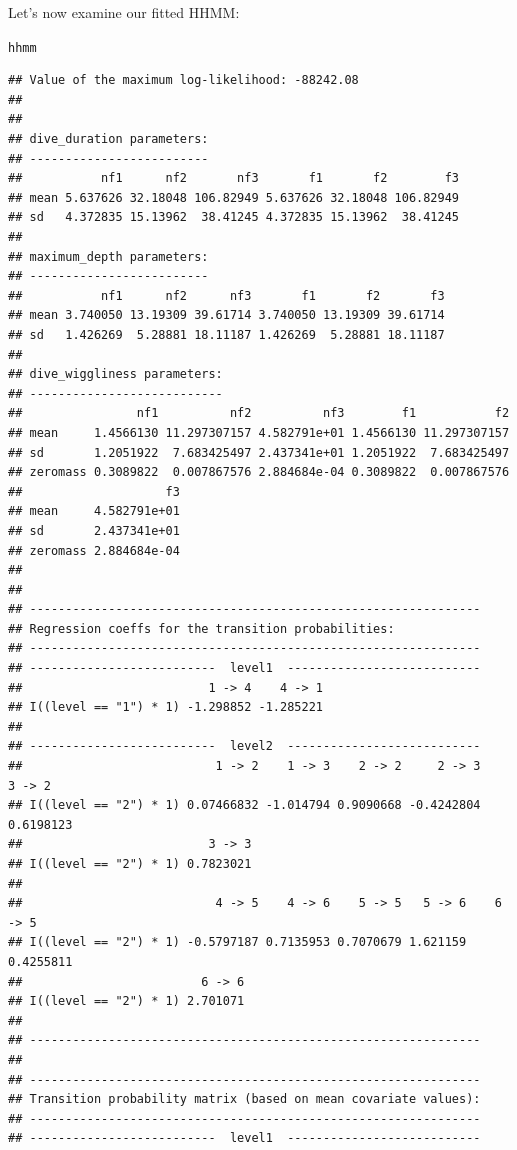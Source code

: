 \documentclass[12pt]{article}\usepackage[]{graphicx}\usepackage[]{xcolor}
\makeatletter
\newcommand{\hldef}[1]{\textcolor[rgb]{0.345,0.345,0.345}{#1}}%
\newenvironment{kframe}{%
 \def\at@end@of@kframe{}%
 \ifinner\ifhmode%
  \def\at@end@of@kframe{\end{minipage}}%
  \begin{minipage}{\columnwidth}%
 \fi\fi%
 \def\FrameCommand##1{\hskip\@totalleftmargin \hskip-\fboxsep
 \colorbox{shadecolor}{##1}\hskip-\fboxsep
     \hskip-\linewidth \hskip-\@totalleftmargin \hskip\columnwidth}%
 \MakeFramed {\advance\hsize-\width
   \@totalleftmargin\z@ \linewidth\hsize
   \@setminipage}}%
 {\par\unskip\endMakeFramed%
 \at@end@of@kframe}
\newenvironment{knitrout}{}{} %
\makeatother
\begin{document}
Let's now examine our fitted HHMM:
\begin{knitrout}
\color{fgcolor}\begin{kframe}
\begin{alltt}
\hldef{hhmm}
\end{alltt}
\begin{verbatim}
## Value of the maximum log-likelihood: -88242.08 
## 
## 
## dive_duration parameters:
## -------------------------
##           nf1      nf2       nf3       f1       f2        f3
## mean 5.637626 32.18048 106.82949 5.637626 32.18048 106.82949
## sd   4.372835 15.13962  38.41245 4.372835 15.13962  38.41245
## 
## maximum_depth parameters:
## -------------------------
##           nf1      nf2      nf3       f1       f2       f3
## mean 3.740050 13.19309 39.61714 3.740050 13.19309 39.61714
## sd   1.426269  5.28881 18.11187 1.426269  5.28881 18.11187
## 
## dive_wiggliness parameters:
## ---------------------------
##                nf1          nf2          nf3        f1           f2
## mean     1.4566130 11.297307157 4.582791e+01 1.4566130 11.297307157
## sd       1.2051922  7.683425497 2.437341e+01 1.2051922  7.683425497
## zeromass 0.3089822  0.007867576 2.884684e-04 0.3089822  0.007867576
##                    f3
## mean     4.582791e+01
## sd       2.437341e+01
## zeromass 2.884684e-04
## 
## 
## ---------------------------------------------------------------
## Regression coeffs for the transition probabilities:
## ---------------------------------------------------------------
## --------------------------  level1  ---------------------------
##                          1 -> 4    4 -> 1
## I((level == "1") * 1) -1.298852 -1.285221
## 
## --------------------------  level2  ---------------------------
##                           1 -> 2    1 -> 3    2 -> 2     2 -> 3    3 -> 2
## I((level == "2") * 1) 0.07466832 -1.014794 0.9090668 -0.4242804 0.6198123
##                          3 -> 3
## I((level == "2") * 1) 0.7823021
## 
##                           4 -> 5    4 -> 6    5 -> 5   5 -> 6    6 -> 5
## I((level == "2") * 1) -0.5797187 0.7135953 0.7070679 1.621159 0.4255811
##                         6 -> 6
## I((level == "2") * 1) 2.701071
## 
## ---------------------------------------------------------------
## 
## ---------------------------------------------------------------
## Transition probability matrix (based on mean covariate values):
## ---------------------------------------------------------------
## --------------------------  level1  ---------------------------

\end{verbatim}
\end{kframe}
\end{knitrout}
\end{document}
